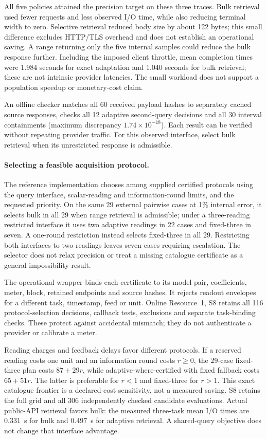 \documentclass[12pt]{article}
\begin{document}
All five policies attained the precision target on these three traces.
Bulk retrieval used fewer requests and less observed I/O time, while
also reducing terminal width to zero. Selective retrieval reduced body
size by about 122 bytes; this small difference excludes HTTP/TLS overhead
and does not establish an operational saving. A range returning only the
five internal samples could reduce the bulk response further. Including
the imposed client throttle, mean completion times were 1.984 seconds
for exact adaptation and 1.040 seconds for bulk retrieval; these are not
intrinsic provider latencies. The small workload does not support a
population speedup or monetary-cost claim.

An offline checker matches all 60 received payload hashes to separately
cached source responses, checks all 12 adaptive second-query decisions
and all 30 interval containments (maximum discrepancy
$1.74\times10^{-18}$). Each result can be verified without repeating
provider traffic. For this observed interface, select bulk retrieval when
its unrestricted response is admissible.
\FloatBarrier
\paragraph{Selecting a feasible acquisition protocol.}
The reference implementation chooses among supplied certified protocols
using the query interface, scalar-reading and information-round limits, and
the requested priority. On the same 29 external pairwise cases at 1\%
internal error, it selects bulk in all 29 when range retrieval is admissible;
under a three-reading restricted interface it uses two adaptive readings in
22 cases and fixed-three in seven. A one-round restriction instead selects
fixed-three in all 29. Restricting both interfaces to two readings leaves
seven cases requiring escalation. The selector does not relax precision or
treat a missing catalogue certificate as a general impossibility result.

The operational wrapper binds each certificate to its model pair,
coefficients, meter, block, retained endpoints and source hashes. It rejects
readout envelopes for a different task, timestamp, feed or unit. Online
Resource~1, S8 retains all 116 protocol-selection decisions, callback tests,
exclusions and separate task-binding checks. These protect against accidental
mismatch; they do not authenticate a provider or calibrate a meter.

Reading charges and feedback delays favor different protocols. If a reserved
reading costs one unit and an information round costs $r\geq0$, the 29-case
fixed-three plan costs $87+29r$, while adaptive-where-certified with fixed
fallback costs $65+51r$. The latter is preferable for $r<1$ and fixed-three
for $r>1$. This exact catalogue frontier is a declared-cost sensitivity,
not a measured saving. S8 retains the full grid and all 306 independently
checked candidate evaluations. Actual public-API retrieval favors bulk:
the measured three-task mean I/O times are 0.331~s for bulk and 0.497~s for
adaptive retrieval. A shared-query objective does not change that interface
advantage.
\end{document}
